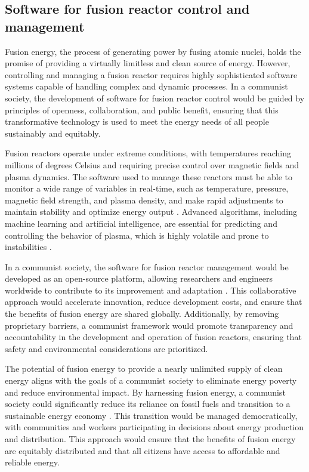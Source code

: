 \subsection{Software for fusion reactor control and management}

Fusion energy, the process of generating power by fusing atomic nuclei, holds the promise of providing a virtually limitless and clean source of energy. However, controlling and managing a fusion reactor requires highly sophisticated software systems capable of handling complex and dynamic processes. In a communist society, the development of software for fusion reactor control would be guided by principles of openness, collaboration, and public benefit, ensuring that this transformative technology is used to meet the energy needs of all people sustainably and equitably.

Fusion reactors operate under extreme conditions, with temperatures reaching millions of degrees Celsius and requiring precise control over magnetic fields and plasma dynamics. The software used to manage these reactors must be able to monitor a wide range of variables in real-time, such as temperature, pressure, magnetic field strength, and plasma density, and make rapid adjustments to maintain stability and optimize energy output \cite[pp.~220-228]{freidberg2008plasma}. Advanced algorithms, including machine learning and artificial intelligence, are essential for predicting and controlling the behavior of plasma, which is highly volatile and prone to instabilities \cite[pp.~310-318]{kulsrud2005fusion}.

In a communist society, the software for fusion reactor management would be developed as an open-source platform, allowing researchers and engineers worldwide to contribute to its improvement and adaptation \cite[pp.~88-94]{wesson2011tokamaks}. This collaborative approach would accelerate innovation, reduce development costs, and ensure that the benefits of fusion energy are shared globally. Additionally, by removing proprietary barriers, a communist framework would promote transparency and accountability in the development and operation of fusion reactors, ensuring that safety and environmental considerations are prioritized.

The potential of fusion energy to provide a nearly unlimited supply of clean energy aligns with the goals of a communist society to eliminate energy poverty and reduce environmental impact. By harnessing fusion energy, a communist society could significantly reduce its reliance on fossil fuels and transition to a sustainable energy economy \cite[pp.~180-188]{mazzucato2015entrepreneurial}. This transition would be managed democratically, with communities and workers participating in decisions about energy production and distribution. This approach would ensure that the benefits of fusion energy are equitably distributed and that all citizens have access to affordable and reliable energy.


